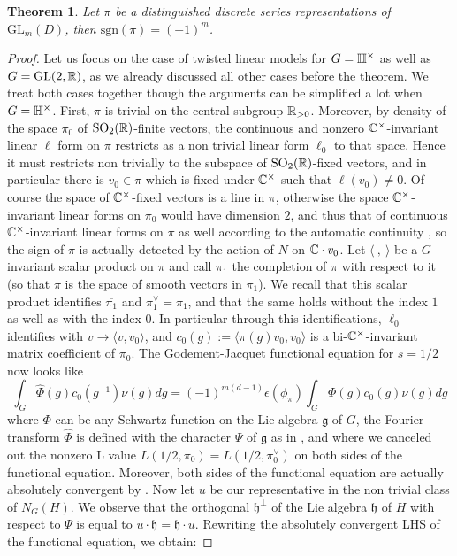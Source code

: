 \documentclass[11pt,letterpaper]{amsart}
\newcommand{\GL}{{\mathrm {GL}}} \newcommand{\PGL}{{\mathrm {PGL}}}
\def\e{\epsilon}
\theoremstyle{plain}
\newtheorem{thm}{Theorem}[section] \newtheorem{cor}[thm]{Corollary}
\numberwithin{equation}{section}
\newcommand{\sg}{\mathrm{sgn}}
\begin{document}
\begin{thm}\label{thm Arch sign}
Let $\pi$ be a distinguished discrete series representations of $\GL_m(D)$, then $\sg(\pi)=(-1)^m$. 
\end{thm} 
\begin{proof}
Let us focus on the case of twisted linear models for $G={\mathbb {H}}^\times$ as well as $G=\GL(2,\BR)$, as we already discussed all other cases before the theorem. We treat both cases together though the arguments can be simplified a lot when  $G={\mathbb {H}}^\times$. First, $\pi$ is trivial on the central subgroup ${\mathbb {R}}_{>0}$. Moreover, by density of the space $\pi_0$ of $\mathrm{SO}_2({\mathbb {R}})$-finite vectors, the continuous and nonzero ${\mathbb {C}}^\times$-invariant linear $\ell$ form on $\pi$ restricts as a non trivial linear form $\ell_0$ to that space. Hence it must restricts non trivially to the subspace of $\mathrm{SO}_2({\mathbb {R}})$-fixed vectors, and in particular there is $v_0\in \pi$ which is fixed under ${\mathbb {C}}^\times$ such that $\ell(v_0)\neq 0$. Of course the space of ${\mathbb {C}}^\times$-fixed vectors is a line in $\pi$, otherwise the space ${\mathbb {C}}^\times$-invariant linear forms on $\pi_0$ would have dimension $2$, and thus that of continuous ${\mathbb {C}}^\times$-invariant linear forms on $\pi$ as well according to the automatic continuity \cite[Theorem 1]{Brylinski-Delorme-H-inv-form-MeroExtension-Invention}, so the sign of $\pi$ is actually detected by the action of $N$ on ${\mathbb {C}}\cdot v_0$. Let $\langle \ , \ \rangle$ be a $G$-invariant scalar product on $\pi$ and call $\pi_1$ the completion of $\pi$ with respect to it (so that $\pi$ is the space of smooth vectors in $\pi_1$). We recall that this scalar product identifies $\overline{\pi_1}$ and $\pi_1^\vee=\pi_1$, and that the same holds without the index $1$ as well as with the index $0$. In particular through this identifications, $\ell_0$ identifies with $v\to \langle v , v_0 \rangle$, and $c_0(g):=\langle \pi(g)v_0, v_0  \rangle$ is a bi-${\mathbb {C}}^\times$-invariant matrix coefficient of $\pi_0$. The Godement-Jacquet functional equation \cite[Theorem 8.7]{GJ} for $s=1/2$ now looks like 
\[\int_G  \widehat{\Phi}(g)c_0(g^{-1}) \nu(g)dg=(-1)^{m(d-1)}\e(\phi_\pi)\int_G  \Phi(g)c_0(g)\nu(g) dg\] where $\Phi$ can be any Schwartz function on the Lie algebra $\mathfrak{g}$ of $G$, the Fourier transform $\widehat{\Phi}$ is defined with the character $\Psi$ of $\mathfrak{g}$ as in \cite[p. 113]{GJ}, and where we canceled out the nonzero L value $L(1/2,\pi_0)=L(1/2,\pi_0^\vee)$ on both sides of the functional equation. Moreover, both sides of the functional equation are actually absolutely convergent by \cite[(9.18) on p. 132]{GJ}. Now let $u$ be our representative in the non trivial class of $N_G(H)$. We observe that the orthogonal $\mathfrak{h}^\perp$ of the Lie algebra $\mathfrak{h}$ of $H$ with respect to $\Psi$ is equal to $u\cdot\mathfrak{h}=\mathfrak{h}\cdot u$. Rewriting the absolutely convergent LHS of the functional equation, we obtain:

\end{proof}
\end{document}
